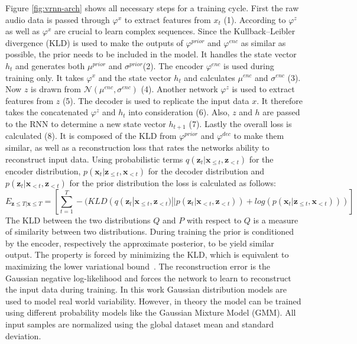 \documentclass[12pt]{article}
\begin{document}
Figure \ref{fig:vrnn-arch} shows all necessary steps for a training cycle.
First the raw audio data is passed through $\varphi^x$ to extract features from $x_t$ (1).
According to \cite{chung2015recurrent} $\varphi^z$ as well as $\varphi^x$ are crucial to learn complex sequences.
Since the Kullback–Leibler divergence (KLD) is used to make the outputs of $\varphi^{prior}$ and $\varphi^{enc}$ as similar as possible, the prior needs to be included in the model.
It handles the state vector $h_t$ and generates both $\mu^{prior}$ and $\sigma^{prior}$(2).
The encoder $\varphi^{enc}$ is used during training only.
It takes $\varphi^x$ and the state vector $h_t$ and calculates $\mu^{enc}$ and $\sigma^{enc}$ (3).
Now $z$ is drawn from $\mathcal{N}(\mu^{enc}, \sigma^{enc})$ (4).
Another network $\varphi^z$ is used to extract features from $z$ (5).
The decoder is used to replicate the input data $x$.
It therefore takes the concatenated $\varphi^z$ and $h_t$ into consideration (6).
Also, $z$ and $h$ are passed to the RNN to determine a new state vector $h_{t+1}$ (7).
Lastly the overall loss is calculated (8).
It is composed of the KLD from $\varphi^{prior}$ and $\varphi^{dec}$ to make them similar, as well as a reconstruction loss that rates the networks ability to reconstruct input data.
Using probabilistic terms $q(\mathbf{z}_t | \mathbf{x}_{\le t}, \mathbf{z}_{<t})$ for the encoder distribution, $p(\mathbf{x}_t | \mathbf{z}_{\le t}, \mathbf{x}_{<t})$ for the decoder distribution and $p(\mathbf{z}_t | \mathbf{x}_{<t}, \mathbf{z}_{<t})$ for the prior distribution the loss is calculated as follows:
$$
E_{\mathbf{z} \le T | \mathbf{x} \le T} = \left[ \sum_{t=1}^T -(KLD(q(\mathbf{z}_t | \mathbf{x}_{\le t}, \mathbf{z}_{<t}) || p(\mathbf{z}_t | \mathbf{x}_{<t}, \mathbf{z}_{<t})) + log(p(\mathbf{x}_t | \mathbf{z}_{\le t}, \mathbf{x}_{<t}))) \right]
$$
The KLD between the two distributions $Q$ and $P$ with respect to $Q$ is a measure of similarity between two distributions.
During training the prior is conditioned by the encoder, respectively the approximate posterior, to be yield similar output.
The property is forced by minimizing the KLD, which is equivalent to maximizing the lower variational bound~\cite{kingma2013auto}.
The reconstruction error is the Gaussian negative log-likelihood and forces the network to learn to reconstruct the input data during training.
In this work Gaussian distribution models are used to model real world variability.
However, in theory the model can be trained using different probability models like the Gaussian Mixture Model (GMM).
All input samples are normalized using the global dataset mean and standard deviation.
\end{document}
